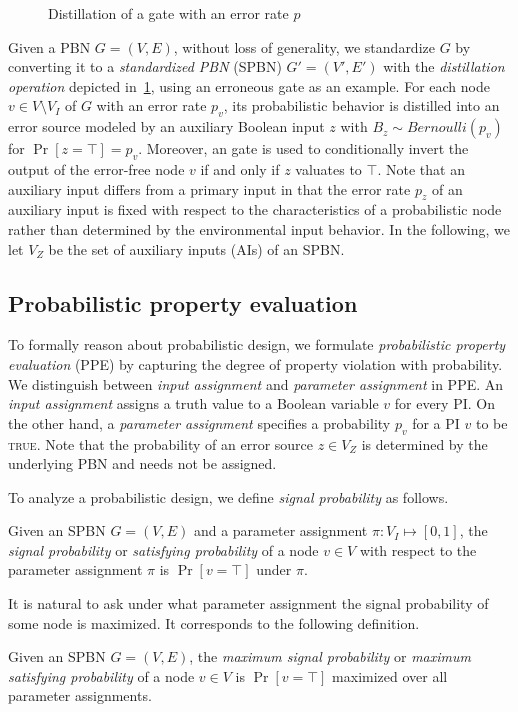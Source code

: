 \begin{figure}[t]
    \centering
    
    \caption{Distillation of a \nand gate with an error rate $p$}
    \label{fig:prob-distillation}
\end{figure}

Given a PBN $G=(V,E)$,
without loss of generality,
we standardize $G$ by converting it to a \textit{standardized PBN} (SPBN) $G'=(V',E')$
with the \textit{distillation operation} depicted in~\cref{fig:prob-distillation},
using an erroneous \nand gate as an example.
For each node $v \in V\setminus V_I$ of $G$ with an error rate $p_v$,
its probabilistic behavior is distilled into an error source modeled by an auxiliary Boolean input $z$
with $B_z\sim\textit{Bernoulli}(p_v)$ for $\Pr[z=\top]=p_v$.
Moreover, an \xor gate is used to conditionally invert the output of the error-free node $v$
if and only if $z$ valuates to $\top$.
Note that an auxiliary input differs from a primary input in that
the error rate $p_z$ of an auxiliary input is fixed with respect to the characteristics of a probabilistic node
rather than determined by the environmental input behavior.
In the following, we let $V_Z$ be the set of auxiliary inputs (AIs) of an SPBN.

\subsection{Probabilistic property evaluation}
To formally reason about probabilistic design,
we formulate \textit{probabilistic property evaluation} (PPE) by capturing the degree of property violation with probability.
We distinguish between \textit{input assignment} and \textit{parameter assignment} in PPE.
An \textit{input assignment} assigns a truth value to a Boolean variable $v$ for every PI.
On the other hand,
a \textit{parameter assignment} specifies a probability $p_v$ for a PI $v$ to be \textsc{true}.
Note that the probability of an error source $z \in V_Z$ is determined by the underlying PBN and needs not be assigned.

To analyze a probabilistic design,
we define \textit{signal probability} as follows.
\begin{definition}
    \label{def:prob-signal-prob}
    Given an SPBN $G=(V,E)$ and a parameter assignment $\pi:V_I\mapsto[0,1]$,
    the \textit{signal probability} or \textit{satisfying probability} of a node $v \in V$
    with respect to the parameter assignment $\pi$ is $\Pr[v=\top]$ under $\pi$.
\end{definition}
It is natural to ask under what parameter assignment the signal probability of some node is maximized.
It corresponds to the following definition.
\begin{definition}
    \label{def:prob-signal-prob-max}
    Given an SPBN $G=(V,E)$,
    the \textit{maximum signal probability} or \textit{maximum satisfying probability} of a node
    $v\in V$ is $\Pr[v=\top]$ maximized over all parameter assignments.
\end{definition}

